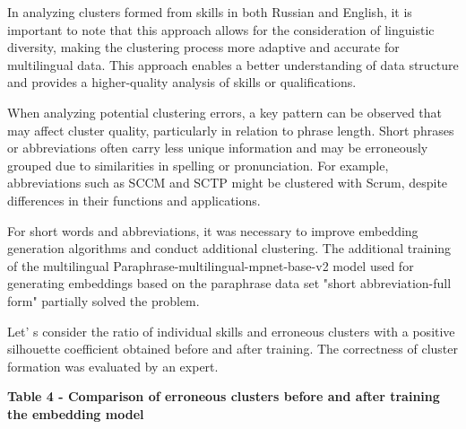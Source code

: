 In analyzing clusters formed from skills in both Russian and English, it
is important to note that this approach allows for the consideration of
linguistic diversity, making the clustering process more adaptive and
accurate for multilingual data. This approach enables a better
understanding of data structure and provides a higher-quality analysis
of skills or qualifications.

When analyzing potential clustering errors, a key pattern can be
observed that may affect cluster quality, particularly in relation to
phrase length. Short phrases or abbreviations often carry less unique
information and may be erroneously grouped due to similarities in
spelling or pronunciation. For example, abbreviations such as SCCM and
SCTP might be clustered with Scrum, despite differences in their
functions and applications.

For short words and abbreviations, it was necessary to improve embedding
generation algorithms and conduct additional clustering. The additional
training of the multilingual Paraphrase-multilingual-mpnet-base-v2 model
used for generating embeddings based on the paraphrase data set "short
abbreviation-full form" partially solved the problem.

Let' s consider the ratio of individual skills and
erroneous clusters with a positive silhouette coefficient obtained
before and after training. The correctness of cluster formation was
evaluated by an expert.

{\bfseries Table 4 - Comparison of erroneous clusters before and after
training the embedding model}

